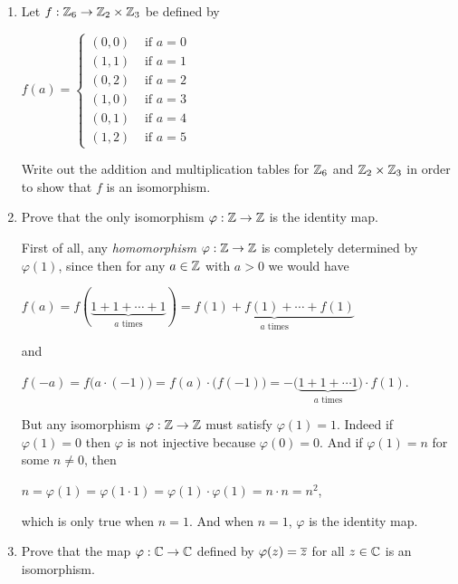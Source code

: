 \documentclass[11pt,fleqn,dvipsnames,usenames]{article}
\begin{document}
\begin{enumerate}
\item Let $f:\mathbb{Z}_6\to\mathbb{Z}_2\times\mathbb{Z}_3$ be defined by
\begin{center}
$f(a) = \begin{cases}(0,0) & \text{ if }a = 0\\(1,1) & \text{ if }a=1\\(0,2) & \text{ if }a=2\\(1,0) & \text{ if }a=3\\(0,1) & \text{ if }a=4\\(1,2) & \text{ if }a=5\end{cases}$
\end{center}
Write out the addition and multiplication tables for $\mathbb{Z}_6$ and $\mathbb{Z}_2\times \mathbb{Z}_3$ in order to show that $f$ is an isomorphism.
\item Prove that the only isomorphism $\varphi:\mathbb{Z} \to \mathbb{Z}$ is the identity map.
\vsmsp

\solution First of all, any \emph{homomorphism} $\varphi:\mathbb{Z}\to\mathbb{Z}$ is completely determined by $\varphi(1)$, since then for any $a\in \mathbb{Z}$ with $a>0$ we would have
\begin{center}
$f(a) = f(\underbrace{1 + 1 + \cdots + 1}_{a\text{ times}}) = \underbrace{f(1) + f(1) + \cdots + f(1)}_{a\text{ times}}$
\end{center}
and
\begin{center}
$f(-a) = f\big(a\cdot(-1)\big) = f(a)\cdot\big(f(-1)\big) = -\big(\underbrace{1 + 1 + \cdots 1}_{a\text{ times}}\big)\cdot f(1)$.
\end{center}
But any isomorphism $\varphi:\mathbb{Z}\to\mathbb{Z}$ must satisfy $\varphi(1) = 1$.  Indeed if $\varphi(1) = 0$ then $\varphi$ is not injective because $\varphi(0) = 0$.  And if $\varphi(1) = n$ for some $n \neq 0$, then

\begin{center}
$n = \varphi(1) = \varphi(1\cdot 1) = \varphi(1)\cdot \varphi(1) = n\cdot n = n^2$,
\end{center}
which is only true when $n=1$.  And when $n=1$, $\varphi$ is the identity map.

\item Prove that the map $\varphi:\mathbb{C}\to\mathbb{C}$ defined by $\varphi(z) = \overline{z}$ for all $z\in \mathbb{C}$ is an isomorphism.
\vsmsp


\end{enumerate}
\end{document}
